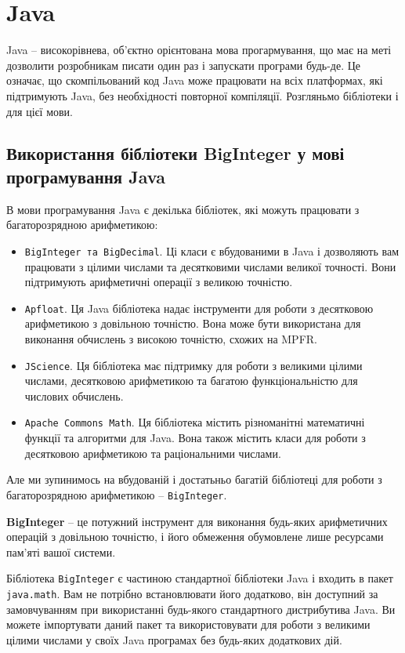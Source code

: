 \section{Java}

Java -- високорівнева, об'єктно орієнтована мова прогармування, що має на меті дозволити розробникам писати один раз і запускати програми будь-де. Це означає, що скомпільований код Java може працювати на всіх платформах, які підтримують Java, без необхідності повторної компіляції. Розгляньмо бібліотеки і для цієї мови.

\subsection{Використання бібліотеки BigInteger у мові програмування Java}

В мови програмування Java є декілька бібліотек, які можуть працювати з багаторозрядною арифметикою:
\begin{itemize}
    \item \texttt{BigInteger та BigDecimal}. Ці класи є вбудованими в Java і дозволяють вам працювати з цілими числами та десятковими числами великої точності. Вони підтримують арифметичні операції з великою точністю.
    \item \texttt{Apfloat}. Ця Java бібліотека надає інструменти для роботи з десятковою арифметикою з довільною точністю. Вона може бути використана для виконання обчислень з високою точністю, схожих на MPFR.
    \item \texttt{JScience}. Ця бібліотека має підтримку для роботи з великими цілими числами, десятковою арифметикою та багатою функціональністю для числових обчислень.
    \item \texttt{Apache Commons Math}. Ця бібліотека містить різноманітні математичні функції та алгоритми для Java. Вона також містить класи для роботи з десятковою арифметикою та раціональними числами.
\end{itemize}

Але ми зупинимось на вбудованій і достатьньо багатій бібліотеці для роботи з багаторозрядною арифметикою -- \texttt{BigInteger}.

\textbf{BigInteger} -- це потужний інструмент для виконання будь-яких арифметичних операцій з довільною точністю, і його обмеження обумовлене лише ресурсами пам'яті вашої системи.

Бібліотека \texttt{BigInteger} є частиною стандартної бібліотеки Java і входить в пакет \texttt{java.math}. Вам не потрібно встановлювати його додатково, він доступний за замовчуванням при використанні будь-якого стандартного дистрибутива Java. Ви можете імпортувати даний пакет та використовувати для роботи з великими цілими числами у своїх Java програмах без будь-яких додаткових дій.

